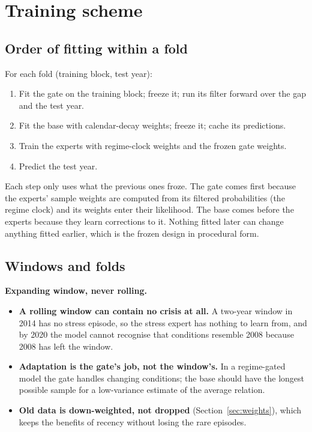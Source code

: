 \section{Training scheme}
\label{sec:training}

\subsection{Order of fitting within a fold}

For each fold (training block, test year):
\begin{enumerate}
\item Fit the gate on the training block; freeze it; run its filter forward over the gap and the test year.
\item Fit the base with calendar-decay weights; freeze it; cache its predictions.
\item Train the experts with regime-clock weights and the frozen gate weights.
\item Predict the test year.
\end{enumerate}

\begin{whybox}
Each step only uses what the previous ones froze. The gate comes first because the experts' sample weights
are computed from its filtered probabilities (the regime clock) and its weights enter their likelihood.
The base comes before the experts because they learn corrections to it. Nothing fitted later can change
anything fitted earlier, which is the frozen design in procedural form.
\end{whybox}

\subsection{Windows and folds}

 \textbf{Expanding window, never rolling.}

\begin{whybox}
\begin{itemize}
\item \textbf{A rolling window can contain no crisis at all.} A two-year window in 2014 has no stress episode,
  so the stress expert has nothing to learn from, and by 2020 the model cannot recognise that conditions
  resemble 2008 because 2008 has left the window.
\item \textbf{Adaptation is the gate's job, not the window's.} In a regime-gated model the gate handles
  changing conditions; the base should have the longest possible sample for a low-variance estimate of the
  average relation.
\item \textbf{Old data is down-weighted, not dropped} (Section~\ref{sec:weights}), which keeps the benefits of
  recency without losing the rare episodes.
\end{itemize}
\end{whybox}

